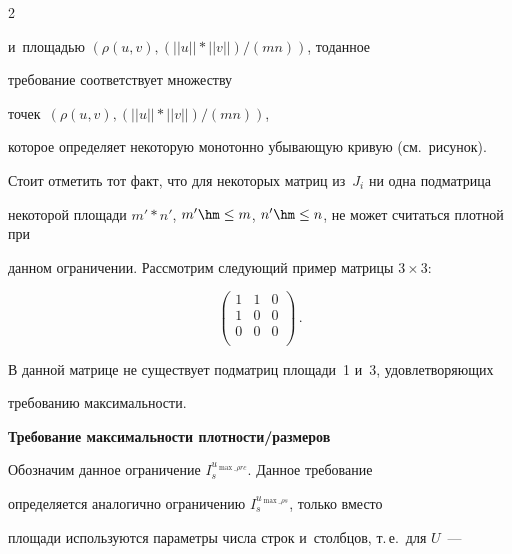 \begin{multicols}{2}
\begin{description}
\noindent


 и~площадью $(\rho(u,v), (||u||*||v||)/(mn))$, то\linebreak данное 


требование со\-от\-вет\-ст\-ву\-ет множеству\linebreak


 то\-чек~$(\rho(u,v), (||u||*||v||)/(mn))$, 


которое  определяет некоторую монотонно убывающую кривую (см.\ рисунок).

















Стоит отметить тот факт, что для некоторых матриц из~$J_i$ ни одна подматрица 


некоторой площади $m'*n'$, $m'\hm \le m$, $n' \hm\le n$, не может считаться плотной при 


данном ограничении. Рассмотрим следующий пример матрицы $3\times 3$:


$$


\begin{pmatrix} 


1 & 1 & 0\\ 1 & 0 & 0 \\  0 & 0 & 0\\


\end{pmatrix}\,.


$$





В данной матрице не существует подматриц площади~1 и~3, удовлетворяющих 


требованию максимальности.





\item[\,] \textbf{Требование максимальности плотности/размеров}





Обозначим данное ограничение $I_s^{u_{\max\_\rho rc}}$. Данное требование 


определяется аналогично ограниче\-нию $I_s^{u_{\max\_\rho s}}$, только вместо 


площади используются параметры числа строк и~столбцов, т.\,е.\ для $U$~--- 



\end{description}
\end{multicols}
